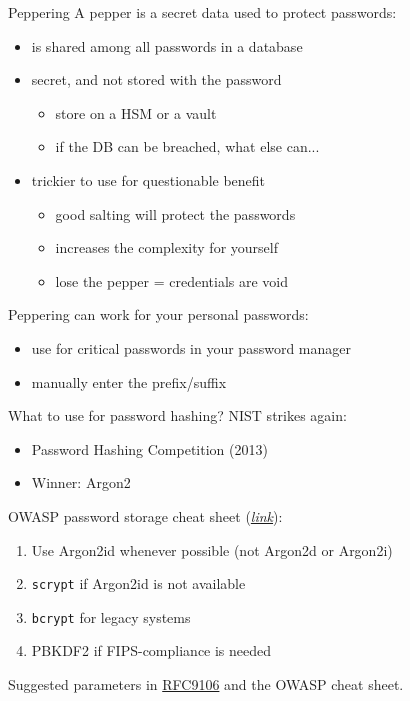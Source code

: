 \begin{frame}{Peppering}
  A pepper is a secret data used to protect passwords:
  \begin{itemize}[<+(1)->]
    \item is shared among all passwords in a database
    \item secret, and not stored with the password
    \begin{itemize}
      \item store on a HSM or a vault
      \item if the DB can be breached, what else can...
    \end{itemize}
    \item trickier to use for questionable benefit
    \begin{itemize}
      \item good salting will protect the passwords
      \item increases the complexity for yourself
      \item lose the pepper = credentials are void
    \end{itemize}
  \end{itemize}

  \pause
  Peppering can work for your personal passwords:
  \begin{itemize}[<+(1)->]
    \item use for critical passwords in your password manager
    \item manually enter the prefix/suffix
  \end{itemize}
\end{frame}

\begin{frame}{What to use for password hashing?}
  NIST strikes again:
  \begin{itemize}[<+(1)->]
    \item Password Hashing Competition (2013)
    \item Winner: Argon2
  \end{itemize}

  \vspace*{1em}

  \pause
  OWASP password storage cheat sheet (\href{https://cheatsheetseries.owasp.org/cheatsheets/Password_Storage_Cheat_Sheet.html}{\textit{link}}):
  \begin{enumerate}[<+(1)->]
    \item Use Argon2id whenever possible (not Argon2d or Argon2i)
    \item \texttt{scrypt} if Argon2id is not available
    \item \texttt{bcrypt} for legacy systems
    \item PBKDF2 if FIPS-compliance is needed
  \end{enumerate}

  \pause
  Suggested parameters in \href{https://datatracker.ietf.org/doc/html/rfc9106\#name-parameter-choice}{RFC9106} and the OWASP cheat sheet.
\end{frame}

